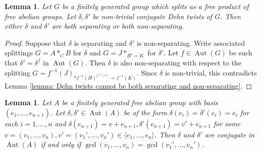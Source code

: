 \documentclass{amsart}
\DeclareMathOperator{\Aut}{Aut}
\theoremstyle{plain}
\newtheorem{lemma}[thm]{Lemma}
\theoremstyle{definition}
\theoremstyle{remark}
\begin{document}
\begin{lemma}
    \label{lem: conjugate Dehn twists either both separating or non-separating}
    Let $G$ be a finitely generated group which splits as a free product of free abelian groups. Let $\delta, \delta'$ be non-trivial conjugate Dehn twists of $G$. Then either $\delta$ and $\delta'$ are both separating or both non-separating. 
\end{lemma}

\begin{proof}
    Suppose that $\delta$ is separating and $\delta'$ is non-separating. Write associated splittings $G = A *_C B$ for $\delta$ and $G = J*_{H^e=K}$ for $\delta'$. Let $f \in \Aut(G)$ be such that $\delta' = \delta^f$ in $\Aut(G)$. Then $\delta$ is also non-separating with respect to the splitting $G = f^{-1}(J)_{*f^{-1}(H)^{f^{-1}(e)} = f^{-1}(K)}$. Since $\delta$ is non-trivial, this contradicts Lemma \ref{lemma: Dehn twists cannot be both separating and non-separating}. 
\end{proof}

\begin{lemma}
    \label{lemma: conjugacy problem for unimodular matrices}
    Let $A$ be a finitely generated free abelian group with basis $(e_1,\ldots,e_{n+1})$. Let $\delta, \delta' \in \Aut(A)$ be of the form $\delta(e_i) = \delta'(e_i) = e_i$ for each $i = 1,\ldots,n$ and $\delta(e_{n+1}) = v + e_{n+1}, \delta'(e_{n+1}) = v' + e_{n+1}$ for some $v = (v_1,\ldots,v_n),v'=(v_1',\ldots,v_n') \in \langle e_1,\ldots, e_{n} \rangle$. Then $\delta$ and $\delta'$ are conjugate in $\Aut(A)$ if and only if $\gcd(v_1,\ldots,v_n) = \gcd(v_1',\ldots,v_n')$.
\end{lemma}
\end{document}
